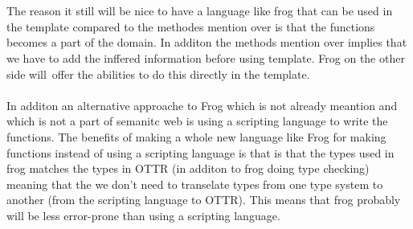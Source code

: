 \\ \\
The reason it still will be nice to have a language like frog that can be used in the template compared to the 
methodes mention over is that the functions becomes a part of the domain. In additon the methods mention over implies
that we have to add the inffered information before using template. Frog on the other side will offer the abilities to 
do this directly in the template. 
\\ \\
In additon an alternative approache to Frog which is not already meantion and which is not a part of semanitc web 
is using a scripting language to write the functions.
The benefits of making a whole new language like Frog for making functions instead of using a scripting language is 
that is that the types used in frog matches the types in OTTR (in additon to frog doing type checking) meaning that 
the we don't need to transelate types from one type system to another (from the scripting language to OTTR). This means 
that frog probably will be less error-prone than using a scripting language.
